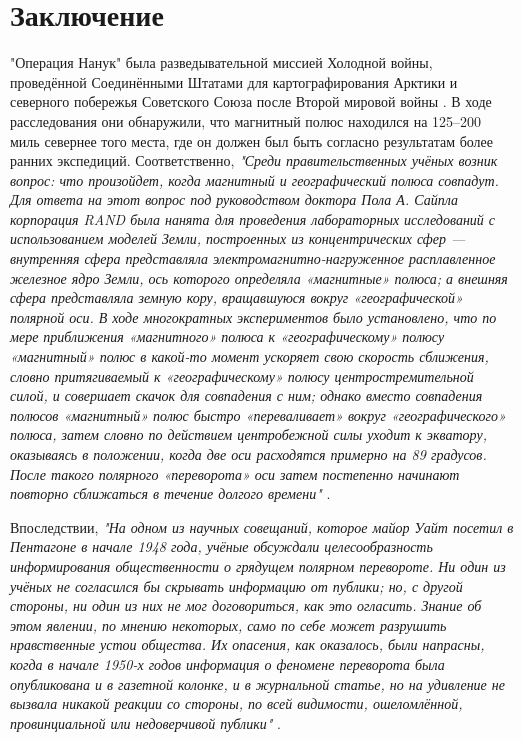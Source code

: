 \documentclass[10pt,twocolumn,letterpaper]{article}
\begin{document}
\section{Заключение}

"Операция Нанук" была разведывательной миссией Холодной войны, проведённой Соединёнными Штатами для картографирования Арктики и северного побережья Советского Союза после Второй мировой войны \cite{137}. В ходе расследования они обнаружили, что магнитный полюс находился на 125–200 миль севернее того места, где он должен был быть согласно результатам более ранних экспедиций. Соответственно, \textit{"Среди правительственных учёных возник вопрос: что произойдет, когда магнитный и географический полюса совпадут. Для ответа на этот вопрос под руководством доктора Пола А. Сайпла корпорация RAND была нанята для проведения лабораторных исследований с использованием моделей Земли, построенных из концентрических сфер — внутренняя сфера представляла электромагнитно-нагруженное расплавленное железное ядро Земли, ось которого определяла «магнитные» полюса; а внешняя сфера представляла земную кору, вращавшуюся вокруг «географической» полярной оси. В ходе многократных экспериментов было установлено, что по мере приближения «магнитного» полюса к «географическому» полюсу «магнитный» полюс в какой-то момент ускоряет свою скорость сближения, словно притягиваемый к «географическому» полюсу центростремительной силой, и совершает скачок для совпадения с ним; однако вместо совпадения полюсов «магнитный» полюс быстро «переваливает» вокруг «географического» полюса, затем словно по действием центробежной силы уходит к экватору, оказываясь в положении, когда две оси расходятся примерно на 89 градусов. После такого полярного «переворота» оси затем постепенно начинают повторно сближаться в течение долгого времени"} \cite{138,139}.

Впоследствии, \textit{"На одном из научных совещаний, которое майор Уайт посетил в Пентагоне в начале 1948 года, учёные обсуждали целесообразность информирования общественности о грядущем полярном перевороте. Ни один из учёных не согласился бы скрывать информацию от публики; но, с другой стороны, ни один из них не мог договориться, как это огласить. Знание об этом явлении, по мнению некоторых, само по себе может разрушить нравственные устои общества. Их опасения, как оказалось, были напрасны, когда в начале 1950-х годов информация о феномене переворота была опубликована и в газетной колонке, и в журнальной статье, но на удивление не вызвала никакой реакции со стороны, по всей видимости, ошеломлённой, провинциальной или недоверчивой публики"} \cite{138,139}.
\end{document}
